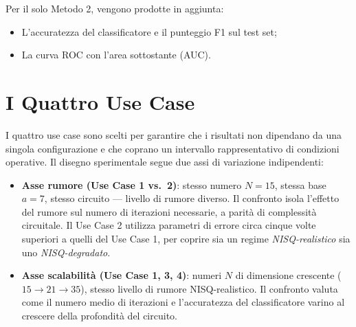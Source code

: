 \begin{onehalfspace}
Per il solo Metodo 2, vengono prodotte in aggiunta:
\begin{itemize}
    \item L'accuratezza del classificatore e il punteggio F1 sul test set;
    \item La curva ROC con l'area sottostante (\ac{AUC}).
\end{itemize}

\section{I Quattro Use Case}
\label{sec:use_case}


I quattro use case sono scelti per garantire che i risultati non dipendano da una singola configurazione e che coprano un intervallo rappresentativo di condizioni operative. Il disegno sperimentale segue due assi di variazione indipendenti:

\begin{itemize}
    \item \textbf{Asse rumore (Use Case 1 vs.\ 2)}: stesso numero $N = 15$, stessa base $a = 7$, stesso circuito --- livello di rumore diverso. Il confronto isola l'effetto del rumore sul numero di iterazioni necessarie, a parità di complessità circuitale. Il Use Case 2 utilizza parametri di errore circa cinque volte superiori a quelli del Use Case 1, per coprire sia un regime \textit{NISQ-realistico} sia uno \textit{NISQ-degradato}.

    \item \textbf{Asse scalabilità (Use Case 1, 3, 4)}: numeri $N$ di dimensione crescente ($15 \to 21 \to 35$), stesso livello di rumore NISQ-realistico. Il confronto valuta come il numero medio di iterazioni e l'accuratezza del classificatore varino al crescere della profondità del circuito.
\end{itemize}


\end{onehalfspace}

